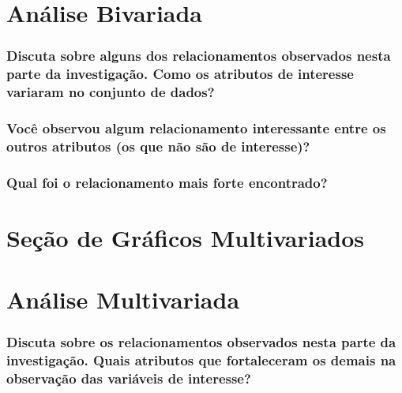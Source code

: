 \documentclass[]{article}
\begin{document}
\hypertarget{analise-bivariada}{%
\section{Análise Bivariada}\label{analise-bivariada}}

\hypertarget{discuta-sobre-alguns-dos-relacionamentos-observados-nesta-parte-da-investigacao.-como-os-atributos-de-interesse-variaram-no-conjunto-de-dados}{%
\subsubsection{Discuta sobre alguns dos relacionamentos observados nesta
parte da investigação. Como os atributos de interesse variaram no
conjunto de
dados?}\label{discuta-sobre-alguns-dos-relacionamentos-observados-nesta-parte-da-investigacao.-como-os-atributos-de-interesse-variaram-no-conjunto-de-dados}}

\hypertarget{voce-observou-algum-relacionamento-interessante-entre-os-outros-atributos-os-que-nao-sao-de-interesse}{%
\subsubsection{Você observou algum relacionamento interessante entre os
outros atributos (os que não são de
interesse)?}\label{voce-observou-algum-relacionamento-interessante-entre-os-outros-atributos-os-que-nao-sao-de-interesse}}

\hypertarget{qual-foi-o-relacionamento-mais-forte-encontrado}{%
\subsubsection{Qual foi o relacionamento mais forte
encontrado?}\label{qual-foi-o-relacionamento-mais-forte-encontrado}}

\hypertarget{secao-de-graficos-multivariados}{%
\section{Seção de Gráficos
Multivariados}\label{secao-de-graficos-multivariados}}

\hypertarget{analise-multivariada}{%
\section{Análise Multivariada}\label{analise-multivariada}}

\hypertarget{discuta-sobre-os-relacionamentos-observados-nesta-parte-da-investigacao.-quais-atributos-que-fortaleceram-os-demais-na-observacao-das-variaveis-de-interesse}{%
\subsubsection{Discuta sobre os relacionamentos observados nesta parte
da investigação. Quais atributos que fortaleceram os demais na
observação das variáveis de
interesse?}\label{discuta-sobre-os-relacionamentos-observados-nesta-parte-da-investigacao.-quais-atributos-que-fortaleceram-os-demais-na-observacao-das-variaveis-de-interesse}}
\end{document}
